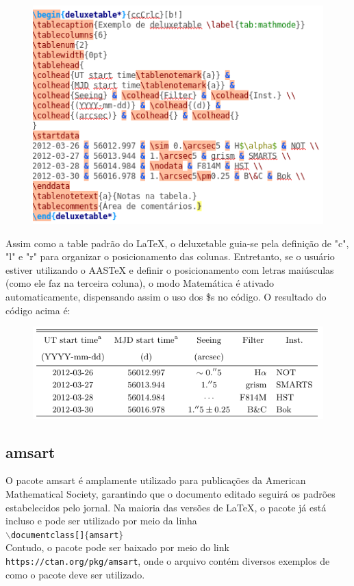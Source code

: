 \documentclass[12pt]{article}
\begin{document}
			\begin{figure}[h]
				\begin{center}
					\includegraphics[scale=0.6]{tabelaAASTEX.png}
				\end{center}
			\end{figure}
		
			Assim como a table padrão do LaTeX, o deluxetable guia-se pela definição de "c", "l" e "r" para organizar o posicionamento das colunas. Entretanto, se o usuário estiver utilizando o AASTeX e definir o posicionamento com letras maiúsculas (como ele faz na terceira coluna), o modo Matemática é ativado automaticamente, dispensando assim o uso dos \$s no código. O resultado do código acima é:
			
			\begin{figure}[h]
				\begin{center}
					\includegraphics[scale=0.4]{rtabelaAASTEX.png}
				\end{center}
			\end{figure}
			
		
		\subsection{amsart}
			O pacote amsart é amplamente utilizado para publicações da American Mathematical Society, garantindo que o documento editado seguirá os padrões estabelecidos pelo jornal. Na maioria das versões de LaTeX, o pacote já está incluso e pode ser utilizado por meio da linha\\
			\texttt{$\backslash$documentclass[]$\{$amsart$\}$}\\
			Contudo, o pacote pode ser baixado por meio do link \texttt{https://ctan.org/pkg/amsart}, onde o arquivo contém diversos exemplos de como o pacote deve ser utilizado.
		
\end{document}
